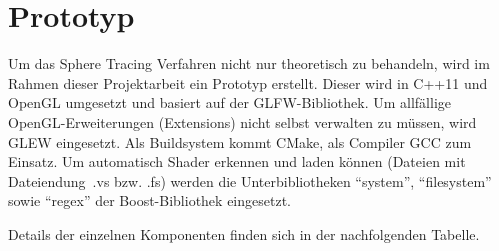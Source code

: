 
\chapter{Prototyp}
\label{chap:prototype}


Um das Sphere Tracing Verfahren nicht nur theoretisch zu behandeln, wird im
Rahmen dieser Projektarbeit ein Prototyp erstellt.  Dieser wird in C++11 und
OpenGL umgesetzt und basiert auf der GLFW-Bibliothek. Um allfällige
OpenGL-Erweiterungen (Extensions) nicht selbst verwalten zu müssen, wird GLEW
eingesetzt. Als Buildsystem kommt CMake, als Compiler GCC zum Einsatz. Um
automatisch Shader erkennen und laden können (Dateien mit Dateiendung~.vs bzw.
.fs) werden die Unterbibliotheken ``system'',  ``filesystem'' sowie
``regex'' der Boost-Bibliothek eingesetzt.

Details der einzelnen Komponenten finden sich in der nachfolgenden Tabelle.


